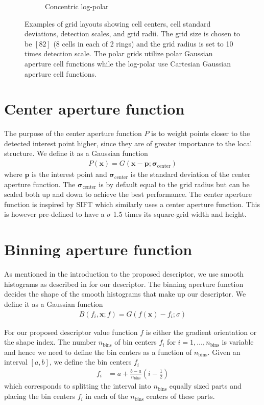 \documentclass[thesis.tex]{subfiles}
\def\x{\mathbf{x}}
\def\p{\mathbf{p}}
\def\sigmacenter{\boldsymbol{\sigma}_\text{center}}
\begin{document}
\begin{figure}[tb]
\begin{subfigure}[t]{0.32\textwidth}
		\caption{Concentric log-polar}
		\label{fig:gridTypeClp}
	\end{subfigure}
	\caption{Examples of grid layouts showing cell centers, cell standard deviations, detection scales, and grid radii. The grid size is chosen to be $[8 2]$ (8 cells in each of 2 rings) and the grid radius is set to 10 times detection scale. The polar grids utilize polar Gaussian aperture cell functions while the log-polar use Cartesian Gaussian aperture cell functions.}
	\label{fig:gridType}
\end{figure}
%
\section{Center aperture function}
\label{sec:centerApertureFunction}
%
The purpose of the center aperture function $P$ is to weight points closer to the detected interest point higher, since they are of greater importance to the local structure. We define it as a Gaussian function
%
\begin{align}
P(\x) = G(\x - \p; \sigmacenter)
\end{align}
%
where $\p$ is the interest point and $\sigmacenter$ is the standard deviation of the center aperture function. The $\sigmacenter$ is by default equal to the grid radius but can be scaled both up and down to achieve the best performance. The center aperture function is inspired by SIFT \cite{lowe2004distinctive} which similarly uses a center aperture function. This is however pre-defined to have a $\sigma$ 1.5 times its square-grid width and height.
%
\section{Binning aperture function}
%
As mentioned in the introduction to the proposed descriptor, we use smooth histograms as described in  for our descriptor. The binning aperture function decides the shape of the smooth histograms that make up our descriptor. We define it as a Gaussian function
\begin{align}
	B(f_i, \x; f) = G(f(\x) - f_i; \sigma)
\end{align}

For our proposed descriptor value function $f$ is either the gradient orientation or the shape index. The number $n_\text{bins}$ of bin centers $f_i$ for $i = 1,\hdots,n_\text{bins}$ is variable and hence we need to define the bin centers as a function of $n_\text{bins}$. Given an interval $[a,b]$, we define the bin centers $f_i$
\begin{align}
	\label{eq:binCenters}
	f_i &= a + \frac{b-a}{n_\text{bins}} \left(i - \frac{1}{2} \right)
\end{align}
which corresponds to splitting the interval into $n_\text{bins}$ equally sized parts and placing the bin centers $f_i$ in each of the $n_\text{bins}$ centers of these parts.
\end{document}
